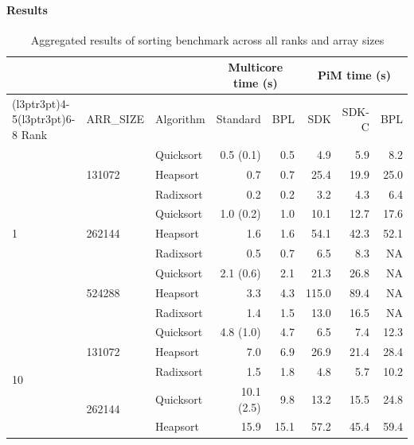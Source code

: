 \paragraph{Results}

\begin{table}[!t]
\centering
{\footnotesize
\renewcommand{\arraystretch}{0.85}
\setlength{\aboverulesep}{1pt}
\setlength{\belowrulesep}{2pt}
\setlength{\cmidrulewidth}{0.1pt}
\setlength{\cmidrulekern}{0pt}

\caption{Aggregated results of sorting benchmark across all ranks and array sizes}
\label{tab:sort-results-all}

\begin{tabular}{lllrrrrr}
\toprule
& & & \multicolumn{2}{c}{Multicore time (s)} & \multicolumn{3}{c}{PiM time (s)} \\
\cmidrule(l{3pt}r{3pt}){4-5}\cmidrule(l{3pt}r{3pt}){6-8}
Rank & ARR\_SIZE & Algorithm & Standard & BPL & SDK & SDK-C & BPL \\
\midrule
    \multirow{9}{*}{1} & \multirow{3}{*}{131072} & Quicksort & 0.5 (0.1) & 0.5 & 4.9 & 5.9 & 8.2 \\
     &  & Heapsort  & 0.7 & 0.7 & 25.4 & 19.9 & 25.0 \\
     &  & Radixsort & 0.2 & 0.2 & 3.2 & 4.3 & 6.4 \\
\cmidrule(l{3pt}r{3pt}){2-8}
     & \multirow{3}{*}{262144} & Quicksort & 1.0 (0.2) & 1.0 & 10.1 & 12.7 & 17.6 \\
     &  & Heapsort  & 1.6 & 1.6 & 54.1 & 42.3 & 52.1 \\
     &  & Radixsort & 0.5 & 0.7 & 6.5 & 8.3 & NA \\
\cmidrule(l{3pt}r{3pt}){2-8}
     & \multirow{3}{*}{524288} & Quicksort & 2.1 (0.6) & 2.1 & 21.3 & 26.8 & NA \\
     &  & Heapsort  & 3.3 & 4.3 & 115.0 & 89.4 & NA \\
     &  & Radixsort & 1.4 & 1.5 & 13.0 & 16.5 & NA \\
\midrule 
    \multirow{9}{*}{10} & \multirow{3}{*}{131072} & Quicksort & 4.8 (1.0) & 4.7 & 6.5 & 7.4 & 12.3 \\
     &  & Heapsort  & 7.0 & 6.9 & 26.9 & 21.4 & 28.4 \\
     &  & Radixsort & 1.5 & 1.8 & 4.8 & 5.7 & 10.2 \\
\cmidrule(l{3pt}r{3pt}){2-8}
     & \multirow{3}{*}{262144} & Quicksort & 10.1 (2.5) & 9.8 & 13.2 & 15.5 & 24.8 \\
     &  & Heapsort  & 15.9 & 15.1 & 57.2 & 45.4 & 59.4 \\

\end{tabular}}
\end{table}
